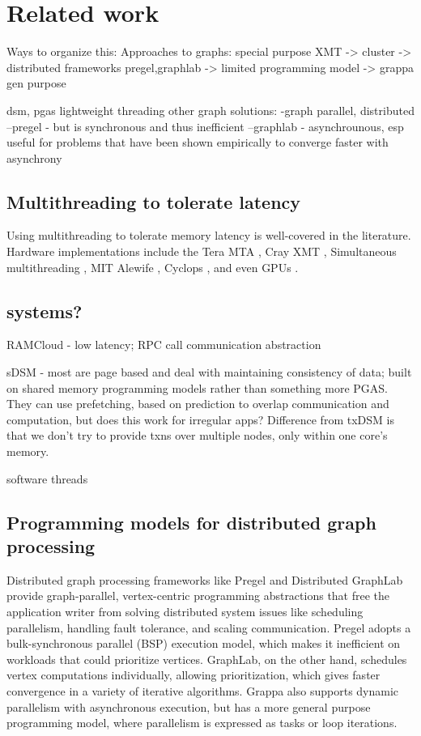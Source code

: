 \section{Related work}

Ways to organize this:
Approaches to graphs: special purpose XMT -> cluster -> distributed frameworks {pregel,graphlab} -> limited programming model -> grappa gen purpose

dsm, pgas
lightweight threading
other graph solutions: 
-graph parallel, distributed
--pregel - but is synchronous and thus inefficient
--graphlab - asynchrounous, esp useful for problems that have been shown empirically to converge faster with asynchrony

\subsection{Multithreading to tolerate latency}
Using multithreading to tolerate memory latency is well-covered in the literature. Hardware implementations include the Tera MTA \cite{Tera}, Cray XMT \cite{}, Simultaneous multithreading \cite{}, MIT Alewife \cite{}, Cyclops \cite{}, and even GPUs \cite{fatahalian}.

\subsection{systems?}
RAMCloud - low latency; RPC call communication abstraction

sDSM - most are page based and deal with maintaining consistency of data; built on shared memory programming models rather than something more PGAS. They can use prefetching, based on prediction to overlap communication and computation, but does this work for irregular apps? Difference from txDSM is that we don't try to provide txns over multiple nodes, only within one core's memory.

software threads

\subsection{Programming models for distributed graph processing}

Distributed graph processing frameworks like Pregel \cite{pregel:2010} and Distributed GraphLab \cite{distgraphlab:vldb12} provide graph-parallel, vertex-centric programming abstractions that free the application writer from solving distributed system issues like scheduling parallelism, handling fault tolerance, and scaling communication. Pregel adopts a bulk-synchronous parallel (BSP) execution model, which makes it inefficient on workloads that could prioritize vertices. GraphLab, on the other hand, schedules vertex computations individually, allowing prioritization, which gives faster convergence in a variety of iterative algorithms. Grappa also supports dynamic parallelism with asynchronous execution, but has a more general purpose programming model, where parallelism is expressed as tasks or loop iterations. 

